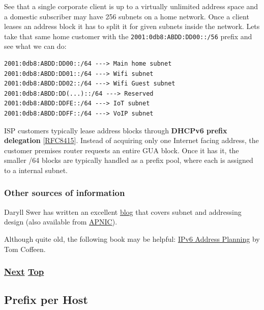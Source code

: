 \documentclass[
]{article}
\begin{document}
See that a single corporate client is up to a virtually unlimited
address space and a domestic subscriber may have 256 subnets on a home
network. Once a client leases an address block it has to split it for
given subnets inside the network. Let\textquotesingle s take that same
home customer with the \texttt{2001:0db8:ABDD:DD00::/56} prefix and see
what we can do:

\begin{verbatim}
2001:0db8:ABDD:DD00::/64 ---> Main home subnet
2001:0db8:ABDD:DD01::/64 ---> Wifi subnet
2001:0db8:ABDD:DD02::/64 ---> Wifi Guest subnet
2001:0db8:ABDD:DD(...)::/64 ---> Reserved
2001:0db8:ABDD:DDFE::/64 ---> IoT subnet
2001:0db8:ABDD:DDFF::/64 ---> VoIP subnet
\end{verbatim}

ISP customers typically lease address blocks through \textbf{DHCPv6
prefix delegation}
{[}\href{https://www.rfc-editor.org/info/rfc8415}{RFC8415}{]}. Instead
of acquiring only one Internet facing address, the customer premises
router requests an entire GUA block. Once it has it, the smaller /64
blocks are typically handled as a prefix pool, where each is assigned to
a internal subnet.

\subsubsection{Other sources of
information}\label{other-sources-of-information}

Daryll Swer has written an excellent
\href{https://www.daryllswer.com/ipv6-architecture-and-subnetting-guide-for-network-engineers-and-operators/}{blog}
that covers subnet and addressing design (also available from
\href{https://blog.apnic.net/2023/04/04/ipv6-architecture-and-subnetting-guide-for-network-engineers-and-operators/}{APNIC}).

Although quite old, the following book may be helpful:
\href{https://www.oreilly.com/library/view/ipv6-address-planning/9781491908211/}{IPv6
Address Planning} by Tom Coffeen.

\subsubsection{\texorpdfstring{\hyperref[prefix-per-host]{Next}
\hyperref[network-design]{Top}}{Next Top}}\label{next-top-4}

\pagebreak

\subsection{Prefix per Host}\label{prefix-per-host}
\end{document}
